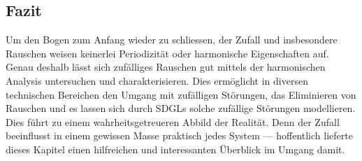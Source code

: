 
\subsection{Fazit\label{brown:fazit}}

Um den Bogen zum Anfang wieder zu schliessen, der Zufall und insbesondere Rauschen weisen keinerlei Periodizität oder harmonische Eigenschaften auf. Genau deshalb lässt sich zufälliges Rauschen gut mittels der harmonischen Analysis untersuchen und charakterisieren. Dies ermöglicht in diversen technischen Bereichen den Umgang mit zufälligen Störungen, das Eliminieren von Rauschen und es lassen sich durch SDGLs solche zufällige Störungen modellieren. Dies führt zu einem wahrheitsgetreueren Abbild der Realität. Denn der Zufall beeinflusst in einem gewissen Masse praktisch jedes System --- hoffentlich lieferte dieses Kapitel einen hilfreichen und interessanten Überblick im Umgang damit.
